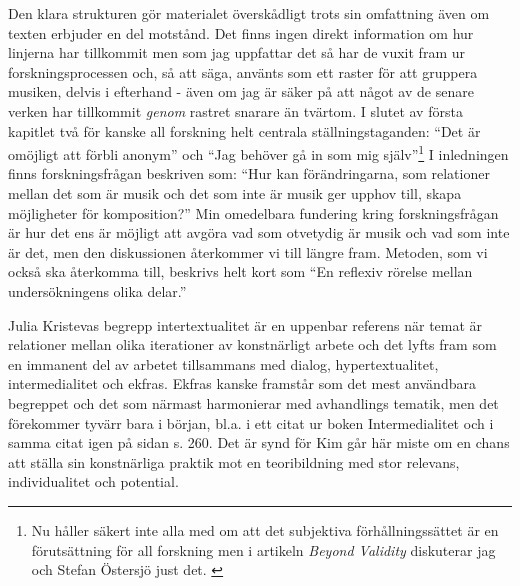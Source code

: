 \documentclass[a4paper]{article}
\begin{document}
Den klara strukturen gör materialet överskådligt trots sin omfattning även om texten erbjuder en del motstånd. Det finns ingen direkt information om hur linjerna har tillkommit men som jag uppfattar det så har de vuxit fram ur forskningsprocessen och, så att säga, använts som ett raster för att gruppera musiken, delvis i efterhand - även om jag är säker på att något av de senare verken har tillkommit \emph{genom} rastret snarare än tvärtom.
I slutet av första kapitlet två för kanske all forskning helt centrala ställningstaganden: ``Det är omöjligt att förbli anonym'' och ``Jag behöver gå in som mig själv''\footnote{Nu håller säkert inte alla med om att det subjektiva förhållningssättet är en förutsättning för all forskning men i artikeln \emph{Beyond Validity} diskuterar jag och Stefan Östersjö just det. \citep{frisk-ost13}}
I inledningen finns forskningsfrågan beskriven som: ``Hur kan förändringarna, som relationer mellan det som är musik och det som inte är musik ger upphov till, skapa möjligheter för komposition?'' Min omedelbara fundering kring forskningsfrågan är hur det ens är möjligt att avgöra vad som otvetydig är musik och vad som inte är det, men den diskussionen återkommer vi till längre fram. Metoden, som vi också ska återkomma till, beskrivs helt kort som ``En reflexiv rörelse mellan undersökningens olika delar.''

Julia Kristevas begrepp intertextualitet är en uppenbar referens när temat är relationer mellan olika iterationer av konstnärligt arbete och det lyfts fram som en immanent del av arbetet tillsammans med dialog, hypertextualitet, intermedialitet och ekfras. Ekfras kanske framstår som det mest användbara begreppet och det som närmast harmonierar med avhandlings tematik, men det förekommer tyvärr bara i början, bl.a. i ett citat ur boken Intermedialitet \citep{lund2002} och i samma citat igen på sidan s. 260. Det är synd för Kim går här miste om en chans att ställa sin konstnärliga praktik mot en teoribildning med stor relevans, individualitet och potential.
\end{document}
